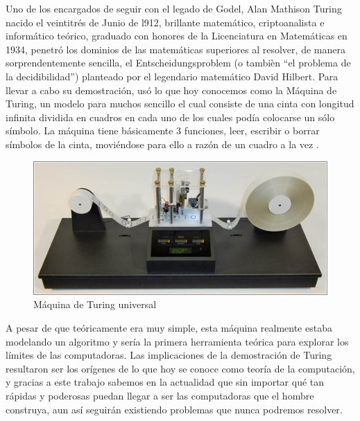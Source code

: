 \documentclass{article}
\begin{document}
Uno de los encargados de seguir con el legado de Godel, Alan Mathison Turing nacido el veintitrés de Junio de l912, brillante matemático, criptoanalista e informático teórico, graduado con honores de la Licenciatura en Matemáticas en 1934, penetró los dominios de las matemáticas superiores al resolver, de manera sorprendentemente sencilla, el Entscheidungsproblem (o tambièn “el problema de la decidibilidad”) planteado por el legendario matemático  David Hilbert. 
Para llevar a cabo su demostración, usó lo que hoy conocemos como la Máquina de Turing, un modelo para muchos  sencillo el cual consiste de una cinta con longitud infinita dividida en cuadros en cada uno de los cuales podía colocarse un sólo símbolo. La máquina tiene básicamente 3 funciones, leer, escribir o borrar símbolos de la cinta, moviéndose para ello a razón de un cuadro a la vez .                                                                                                                                                                                                                                                                                                   \begin{figure}[h!]
\centering
\includegraphics[scale=0.6]{turingFull560.jpg}
\caption{Máquina de Turing universal}
\label{fig:universe}
\end{figure}           

A pesar de que teóricamente era muy simple, esta máquina realmente estaba modelando un algoritmo y sería la primera herramienta teórica para explorar los límites de las computadoras. Las implicaciones de la demostración de Turing resultaron ser los orígenes de lo que hoy se conoce como teoría de la computación, y gracias a este trabajo sabemos en la actualidad que sin importar qué tan rápidas y poderosas puedan llegar a ser las computadoras que el hombre construya, aun así seguirán existiendo problemas que nunca podremos resolver. 
 
\end{document}
